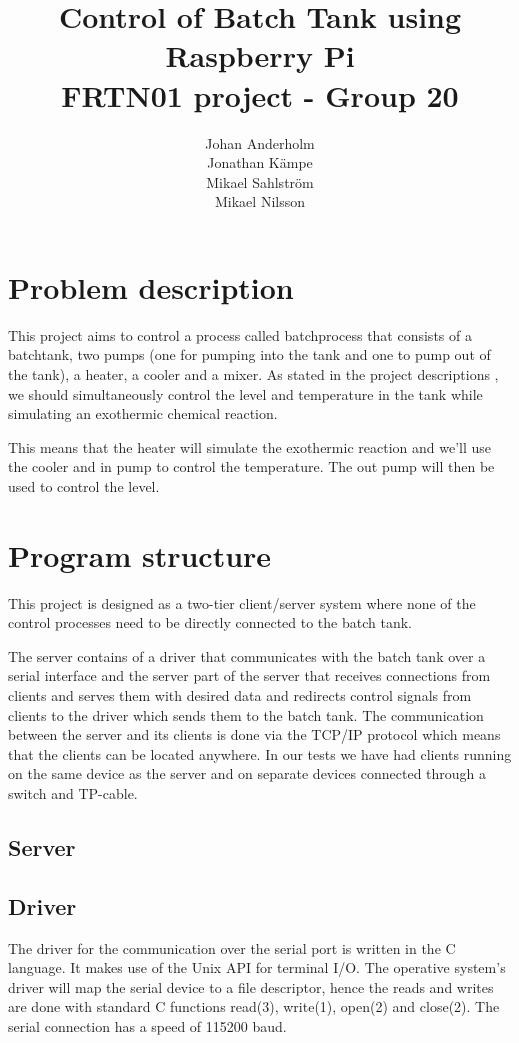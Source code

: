 \documentclass{article}
\title{Control of Batch Tank using Raspberry Pi \\ FRTN01 project - Group 20}
\date{}
\author{Johan Anderholm \\ Jonathan Kämpe \\ Mikael Sahlström \\ Mikael Nilsson}
\begin{document}
\maketitle
\newpage
\tableofcontents
\newpage
\section{Problem description}
This project aims to control a process called batchprocess that consists of a batchtank, two pumps (one for pumping into the tank and one to pump out of the tank), a heater, a cooler and a mixer. As stated in the project descriptions \cite[p.~6]{project12}, we should simultaneously control the level and temperature in the tank while simulating an exothermic chemical reaction.

This means that the heater will simulate the exothermic reaction and we'll use the cooler and in pump to control the temperature. The out pump will then be used to control the level.

\section{Program structure}
This project is designed as a two-tier client/server system \cite[p.~6]{clientserver} where none of the control processes need to be directly connected to the batch tank.

The server contains of a driver that communicates with the batch tank over a serial interface and the server part of the server that receives connections from clients and serves them with desired data and redirects control signals from clients to the driver which sends them to the batch tank. The communication between the server and its clients is done via the TCP/IP protocol which means that the clients can be located anywhere. In our tests we have had clients running on the same device as the server and on separate devices connected through a switch and TP-cable.

\subsection{Server}

\subsection{Driver}
The driver for the communication over the serial port is written in the C language. It makes use of the Unix API for terminal I/O. The operative system's driver will map the serial device to a file descriptor, hence the reads and writes are done with standard C functions read(3), write(1), open(2) and close(2).  The serial connection has a speed of 115200 baud. 
\end{document}
